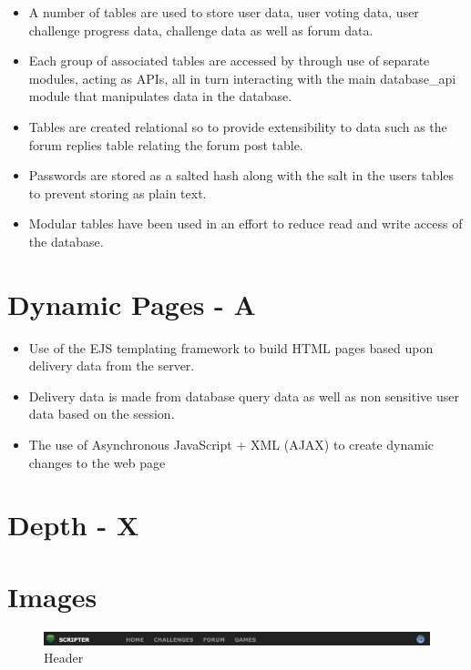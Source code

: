\documentclass[a4paper]{article}
\begin{document}
\begin{itemize}
  \item{A number of tables are used to store user data, user voting data,
      user challenge progress data, challenge data as well as forum data.}
  \item{Each group of associated tables are accessed by through use of separate
    modules, acting as APIs, all in turn interacting with the main database\_api
    module that manipulates data in the database.}
  \item{Tables are created relational so to provide extensibility to data such
    as the forum replies table relating the forum post table.}
  \item{Passwords are stored as a salted hash along with the salt in the users
    tables to prevent storing as plain text.}
  \item{Modular tables have been used in an effort to reduce read and write
    access of the database.}
\end{itemize}

\section{Dynamic Pages - A}
\begin{itemize}
  \item{Use of the EJS templating framework to build HTML pages based upon
    delivery data from the server.}
  \item{Delivery data is made from database query data as well as non sensitive
    user data based on the session.}
  \item{The use of Asynchronous JavaScript + XML (AJAX) to create dynamic
    changes to the web page}
\end{itemize}

\section{Depth - X}

\appendix

\section{Images}

\begin{figure}[h!]
  \centering
  \includegraphics[width=1\linewidth]{images/header.png}
  \caption{Header}
  \label{fig:header}
\end{figure}
\end{document}
